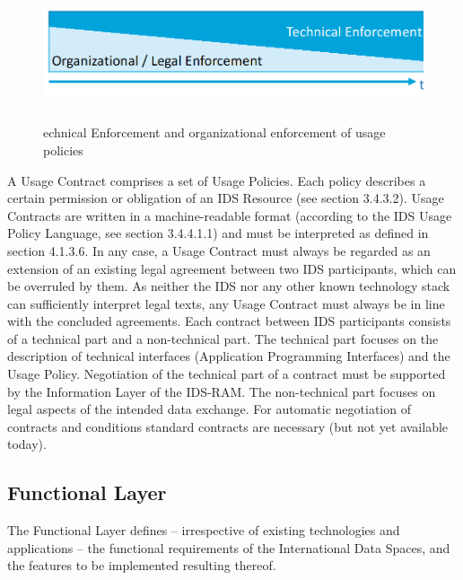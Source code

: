 
\begin{figure}[H]
	\begin{Center}
		\includegraphics[width=6.53in,height=1.56in]{./media/image20_new.png}
		\caption{echnical Enforcement and organizational enforcement of usage policies}
		\label{fig:echnical_Enforcement_and_organizational_enforcement_of_usage_policies}
	\end{Center}
\end{figure}




A Usage Contract comprises a set of Usage Policies. Each policy describes a certain permission or obligation of an IDS Resource (see section 3.4.3.2). Usage Contracts are written in a machine-readable format (according to the IDS Usage Policy Language, see section 3.4.4.1.1) and must be interpreted as defined in section 4.1.3.6. In any case, a Usage Contract must always be regarded as an extension of an existing legal agreement between two IDS participants, which can be overruled by them. As neither the IDS nor any other known technology stack can sufficiently interpret legal texts, any Usage Contract must always be in line with the concluded agreements. 
Each contract between IDS participants consists of a technical part and a non-technical part. The technical part focuses on the description of technical interfaces (Application Programming Interfaces) and the Usage Policy. Negotiation of the technical part of a contract must be supported by the Information Layer of the IDS-RAM. The non-technical part focuses on legal aspects of the intended data exchange. For automatic negotiation of contracts and conditions standard contracts are necessary (but not yet available today). 


\subsection{Functional Layer}
\label{sec_functional_layer}
The Functional Layer defines –  irrespective of existing technologies and applications –  the functional requirements of the International Data Spaces, and the features to be implemented resulting thereof.




